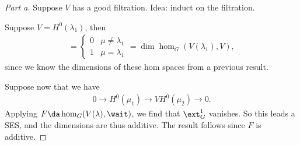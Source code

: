 \begin{proof}[Part a]

Suppose \(V\) has a good filtration. Idea: induct on the filtration.

Suppose \(V = H^0(\lambda_1)\), then
\begin{align*}  
[V: H^0(\mu) ] = 
\begin{cases}
0 & \mu \neq \lambda_1 \\
1 & \mu = \lambda_1
\end{cases}
= \dim \hom_G(V(\lambda_1), V)
,\end{align*} since we know the dimensions of these hom spaces from a
previous result.

Suppose now that we have
\begin{align*}  
0 \to H^0(\mu_1) \to V H^0(\mu_2) \to 0
.\end{align*} Applying \(F \da \hom_G(V(\lambda), \wait)\), we find that
\(\ext^1_G\) vanishes. So this leads a SES, and the dimensions are thus
additive. The result follows since \(F\) is additive.

\end{proof}

